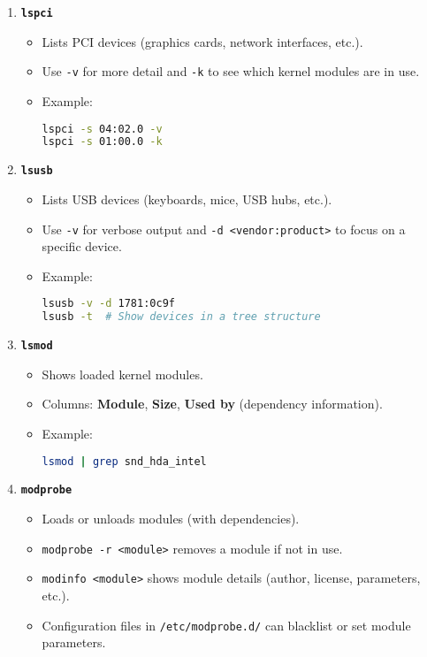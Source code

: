 \documentclass[a4paper]{report}
\begin{document}
\begin{enumerate}
    \item \textbf{\texttt{lspci}}
    \begin{itemize}
        \item Lists PCI devices (graphics cards, network interfaces, etc.).
        \item Use \texttt{-v} for more detail and \texttt{-k} to see which kernel modules are in use.
        \item Example:
        \begin{lstlisting}[language=bash]
lspci -s 04:02.0 -v
lspci -s 01:00.0 -k
        \end{lstlisting}
    \end{itemize}

    \item \textbf{\texttt{lsusb}}
    \begin{itemize}
        \item Lists USB devices (keyboards, mice, USB hubs, etc.).
        \item Use \texttt{-v} for verbose output and \texttt{-d <vendor:product>} to focus on a specific device.
        \item Example:
        \begin{lstlisting}[language=bash]
lsusb -v -d 1781:0c9f
lsusb -t  # Show devices in a tree structure
        \end{lstlisting}
    \end{itemize}

    \item \textbf{\texttt{lsmod}}
    \begin{itemize}
        \item Shows loaded kernel modules.
        \item Columns: \textbf{Module}, \textbf{Size}, \textbf{Used by} (dependency information).
        \item Example:
        \begin{lstlisting}[language=bash]
lsmod | grep snd_hda_intel
        \end{lstlisting}
    \end{itemize}

    \item \textbf{\texttt{modprobe}}
    \begin{itemize}
        \item Loads or unloads modules (with dependencies).
        \item \texttt{modprobe -r <module>} removes a module if not in use.
        \item \texttt{modinfo <module>} shows module details (author, license, parameters, etc.).
        \item Configuration files in \texttt{/etc/modprobe.d/} can blacklist or set module parameters.
    \end{itemize}
\end{enumerate}
\end{document}
